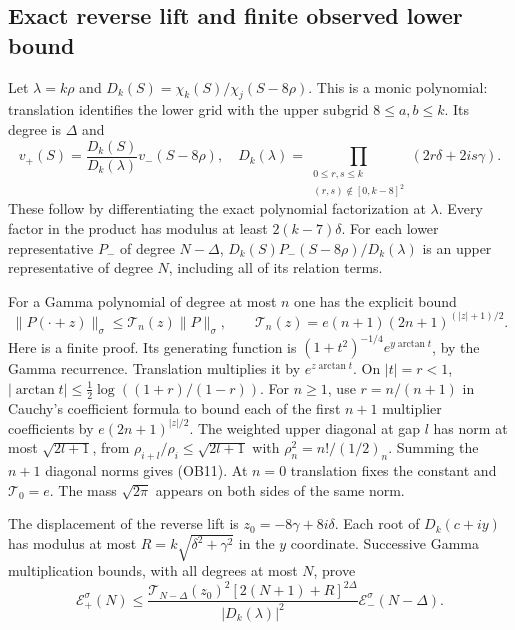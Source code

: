 \subsection{Exact reverse lift and finite observed lower bound}
Let $\lambda=k\rho$ and
$D_k(S)=\chi_k(S)/\chi_j(S-8\rho)$. This is a monic polynomial:
translation identifies the lower grid with the upper subgrid
$8\le a,b\le k$. Its degree is $\Delta$ and
\[
 v_+(S)=\frac{D_k(S)}{D_k(\lambda)}v_-(S-8\rho),\quad
 D_k(\lambda)=\prod_{\substack{0\le r,s\le k\\(r,s)\notin[0,k-8]^2}}
 (2r\delta+2is\gamma).\tag{OB10}
\]
These follow by differentiating the exact polynomial factorization at
$\lambda$. Every factor in the product has modulus at least
$2(k-7)\delta$. For each lower representative $P_-$ of degree
$N-\Delta$, $D_k(S)P_-(S-8\rho)/D_k(\lambda)$ is an upper
representative of degree $N$, including all of its relation terms.

For a Gamma polynomial of degree at most $n$ one has the explicit bound
\[
 \|P(\cdot+z)\|_\sigma\le\mathcal T_n(z)\|P\|_\sigma,
 \qquad\mathcal T_n(z)=e(n+1)(2n+1)^{(|z|+1)/2}.\tag{OB11}
\]
Here is a finite proof. Its generating function is
$(1+t^2)^{-1/4}e^{y\arctan t}$, by the Gamma recurrence.
Translation multiplies it by $e^{z\arctan t}$. On $|t|=r<1$,
$|\arctan t|\le\tfrac12\log((1+r)/(1-r))$.
For $n\ge1$, use $r=n/(n+1)$ in Cauchy's coefficient formula to
bound each of the first $n+1$ multiplier coefficients by
$e(2n+1)^{|z|/2}$. The weighted upper diagonal at gap $l$ has norm
at most $\sqrt{2l+1}$, from $\rho_{i+l}/\rho_i\le\sqrt{2l+1}$
with $\rho_n^2=n!/(1/2)_n$. Summing the $n+1$ diagonal norms gives
(OB11). At $n=0$ translation fixes the constant and $\mathcal T_0=e$.
The mass $\sqrt{2\pi}$ appears on both sides of the same norm.

The displacement of the reverse lift is $z_0=-8\gamma+8i\delta$.
Each root of $D_k(c+iy)$ has modulus at most
$R=k\sqrt{\delta^2+\gamma^2}$ in the $y$ coordinate.
Successive Gamma multiplication bounds, with all degrees at most $N$,
prove
\[
 \mathcal E_+^\sigma(N)\le
 \frac{\mathcal T_{N-\Delta}(z_0)^2[2(N+1)+R]^{2\Delta}}
 {|D_k(\lambda)|^2}\mathcal E_-^\sigma(N-\Delta).\tag{OB12}
\]

